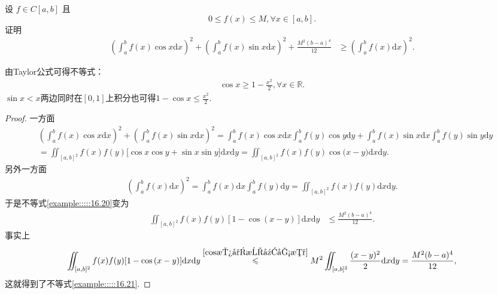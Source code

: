 \documentclass[../../main.tex]{subfiles}%
\begin{document}
\begin{example}
设 $f \in C[a,b]$ 且
\[0 \leqslant f(x) \leqslant M, \forall x \in [a,b].\]
证明
\begin{align}\label{example:::::16.20}
\left(\int_{a}^{b}f(x)\cos x\mathrm{d}x\right)^2 + \left(\int_{a}^{b}f(x)\sin x\mathrm{d}x\right)^2 + \frac{M^2(b - a)^4}{12} &\geqslant \left(\int_{a}^{b}f(x)\mathrm{d}x\right)^2.
\end{align}
\end{example}
\begin{remark}
由Taylor公式可得不等式：
\begin{align}\label{cos放小成幂函数}
\cos x\geqslant  1-\frac{x^2}{2},\forall x\in \mathbb{R}.
\end{align}
$\sin x<x$两边同时在$[0,1]$上积分也可得$1-\cos x\leqslant \frac{x^2}{2}$.
\end{remark}
\begin{proof}
一方面
\begin{align*}
&\left( \int_a^b{f(x)\cos x\mathrm{d}x} \right) ^2+\left( \int_a^b{f(x)\sin x\mathrm{d}x} \right) ^2=\int_a^b{f(x)\cos x\mathrm{d}x}\int_a^b{f(y)\cos y\mathrm{d}y}+\int_a^b{f(x)\sin x\mathrm{d}x}\int_a^b{f(y)\sin y\mathrm{d}y}
\\
&=\iint_{[a,b]^2}{f(x)f(y)[\cos x\cos y}+\sin x\sin y]\mathrm{d}x\mathrm{d}y=\iint_{[a,b]^2}{f(x)f(y)\cos\mathrm{(}x}-y)\mathrm{d}x\mathrm{d}y.
\end{align*}
另外一方面
\begin{align*}
\left( \int_a^b{f(x)\mathrm{d}x} \right) ^2=\int_a^b{f(x)\mathrm{d}x}\int_a^b{f(y)\mathrm{d}y}=\iint_{[a,b]^2}{f(x)f(y)\mathrm{d}x\mathrm{d}y.}
\end{align*}
于是不等式\eqref{example:::::16.20}变为
\begin{align}\label{example:::::16.21}
\iint_{[a,b]^2}f(x)f(y)[1 - \cos(x - y)]\mathrm{d}x\mathrm{d}y &\leqslant \frac{M^2(b - a)^4}{12}.
\end{align}
事实上
\begin{align*}
\iint_{[a,b]^2}{f(x)f(y)[1}-\cos\mathrm{(}x-y)]\mathrm{d}x\mathrm{d}y\overset{\eqref{cos放小成幂函数}}{\leqslant}M^2\iint_{[a,b]^2}{\frac{(x-y)^2}{2}\mathrm{d}x\mathrm{d}y}=\frac{M^2(b-a)^4}{12},
\end{align*}
这就得到了不等式\eqref{example:::::16.21}. 
\end{proof}
\end{document}
